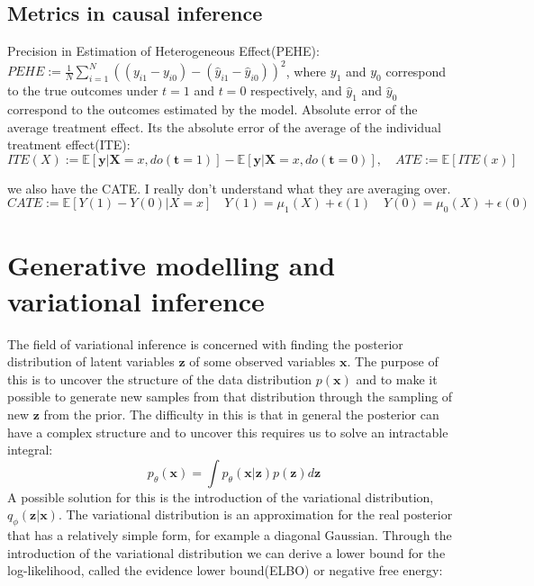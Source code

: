 \documentclass{report}
\newcommand{\E}{\mathbb{E}}
\newcommand{\bt}{\mathbf{t}}
\newcommand{\bX}{\mathbf{X}}
\newcommand{\bx}{\mathbf{x}}
\newcommand{\by}{\mathbf{y}}
\newcommand{\bz}{\mathbf{z}}
\begin{document}
\section{Metrics in causal inference}
Precision in Estimation of Heterogeneous Effect(PEHE): $PEHE := \frac{1}{N}\sum\limits^N_{i=1}((y_{i1} - y_{i0}) - (\hat{y}_{i1} - \hat{y}_{i0}))^2$, where $y_1$ and $y_0$ correspond to the true outcomes under $t=1$ and $t=0$ respectively, and $\hat{y}_1$ and $\hat{y}_0$ correspond to the outcomes estimated by the model. 
Absolute error of the average treatment effect. Its the absolute error of the average of the individual treatment effect(ITE): 
\begin{equation}
    ITE(X) := \E[\by | \bX=x, do(\bt=1)] - \E[\by | \bX=x, do(\bt=0)], \quad ATE := \E[ITE(x)]
\end{equation}

we also have the CATE. I really don't understand what they are averaging over.
\begin{equation}
    CATE := \E[Y(1) - Y(0) | X=x] \quad Y(1) = \mu_1(X) + \epsilon(1) \quad Y(0) = \mu_0(X) + \epsilon(0)
\end{equation}


\chapter{Generative modelling and variational inference}
The field of variational inference is concerned with finding the posterior distribution of latent variables $\bz$ of some observed variables $\bx$. The purpose of this is to uncover the structure of the data distribution $p(\bx)$ and to make it possible to generate new samples from that distribution through the sampling of new $\bz$ from the prior\footnotemark[\ref{note:citation}]. The difficulty in this is that in general the posterior can have a complex structure and to uncover this requires us to solve an intractable integral:
\begin{equation}
    p_\theta(\bx) = \int p_\theta(\bx|\bz)p(\bz) d\bz
\end{equation}
A possible solution for this is the introduction of the variational distribution, $q_\phi(\bz|\bx)$\footnotemark[\ref{note:citation}]. The variational distribution is an approximation for the real posterior that has a relatively simple form, for example a diagonal Gaussian. Through the introduction of the variational distribution we can derive a lower bound for the log-likelihood, called the evidence lower bound(ELBO) or negative free energy\footnotemark[\ref{note:citation}]:
\end{document}
